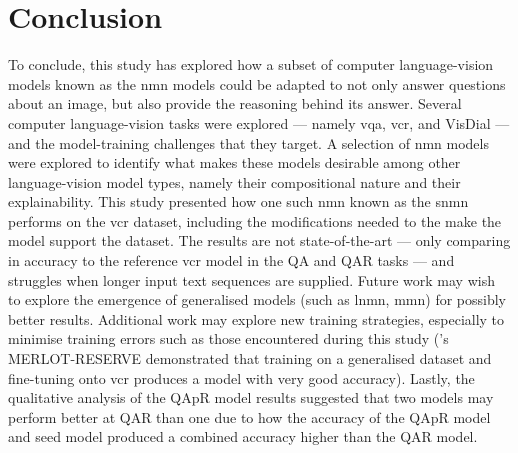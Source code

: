 \chapter{Conclusion}
\label{chp:conclusion}

To conclude, this study has explored how a subset of computer language-vision models known as the \gls{nmn} models could be adapted to not only answer questions about an image, but also provide the reasoning behind its answer.
Several computer language-vision tasks were explored --- namely \gls{vqa}, \gls{vcr}, and VisDial --- and the model-training challenges that they target.
A selection of \gls{nmn} models were explored to identify what makes these models desirable among other language-vision model types, namely their compositional nature and their explainability.
This study presented how one such \gls{nmn} known as the \gls{snmn} performs on the \gls{vcr} dataset, including the modifications needed to the make the model support the dataset.
The results are not state-of-the-art --- only comparing in accuracy to the reference \gls{vcr} model in the Q\rightarrow{}A and QA\rightarrow{}R tasks --- and struggles when longer input text sequences are supplied.
Future work may wish to explore the emergence of generalised models (such as \gls{lnmn}, \gls{mmn}) for possibly better results.
Additional work may explore new training strategies, especially to minimise training errors such as those encountered during this study (\citeauthor{zellers_merlot_2022}'s MERLOT-RESERVE demonstrated that training on a generalised dataset and fine-tuning onto \gls{vcr} produces a model with very good accuracy).
Lastly, the qualitative analysis of the QAp\rightarrow{}R model results suggested that two models may perform better at Q\rightarrow{}AR than one due to how the accuracy of the QAp\rightarrow{}R model and seed model produced a combined accuracy higher than the Q\rightarrow{}AR model.
